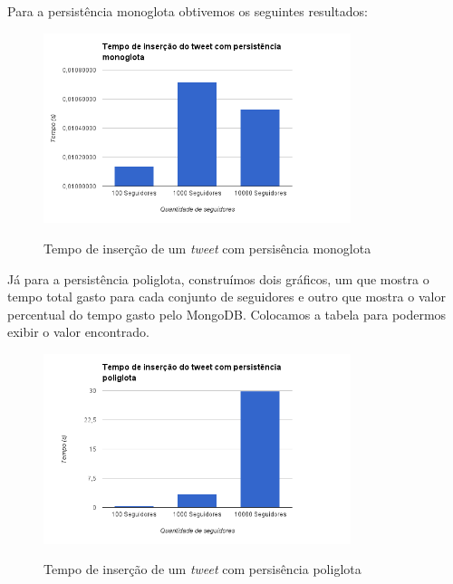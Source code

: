 Para a persistência monoglota obtivemos os seguintes resultados:

\begin{figure}[H]
    \centering
    \caption{Tempo de inserção de um \textit{tweet} com persisência monoglota}
    \includegraphics[width=0.8\textwidth]{./04-figuras/insert_mono.png}
    \label{fig:insert_mono}
\end{figure}



Já para a persistência poliglota, construímos dois gráficos, um que mostra o tempo total gasto para cada conjunto de seguidores e outro que mostra o valor percentual do tempo gasto pelo MongoDB. Colocamos a tabela para podermos exibir o valor encontrado.

\begin{figure}[H]
    \centering
    \caption{Tempo de inserção de um \textit{tweet} com persisência poliglota}
    \includegraphics[width=0.8\textwidth]{./04-figuras/insert_poli.png}
    \label{fig:insert_poli}
\end{figure}



